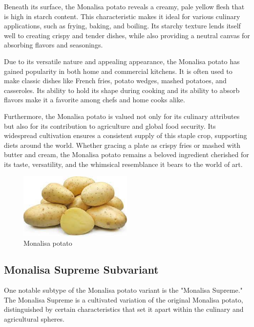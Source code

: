 \documentclass[../../../../main.tex]{subfiles}
\begin{document}
Beneath its surface, the Monalisa potato reveals a creamy, pale yellow flesh that is high in starch content. This characteristic makes it ideal for various culinary applications, such as frying, baking, and boiling. Its starchy texture lends itself well to creating crispy and tender dishes, while also providing a neutral canvas for absorbing flavors and seasonings.

Due to its versatile nature and appealing appearance, the Monalisa potato has gained popularity in both home and commercial kitchens. It is often used to make classic dishes like French fries, potato wedges, mashed potatoes, and casseroles. Its ability to hold its shape during cooking and its ability to absorb flavors make it a favorite among chefs and home cooks alike.

Furthermore, the Monalisa potato is valued not only for its culinary attributes but also for its contribution to agriculture and global food security. Its widespread cultivation ensures a consistent supply of this staple crop, supporting diets around the world. Whether gracing a plate as crispy fries or mashed with butter and cream, the Monalisa potato remains a beloved ingredient cherished for its taste, versatility, and the whimsical resemblance it bears to the world of art.


\begin{figure}[!htbp]
    \centering
    \includegraphics[width=0.5\textwidth]{Parts/PartExample/Chapters/potato_folder/figures/potato_monalisa.jpeg}
    \caption{Monalisa potato}
    \label{fig:potato_monalisa}
\end{figure}


\subsection{Monalisa Supreme Subvariant}
One notable subtype of the Monalisa potato variant is the "Monalisa Supreme." The Monalisa Supreme is a cultivated variation of the original Monalisa potato, distinguished by certain characteristics that set it apart within the culinary and agricultural spheres.
\end{document}
